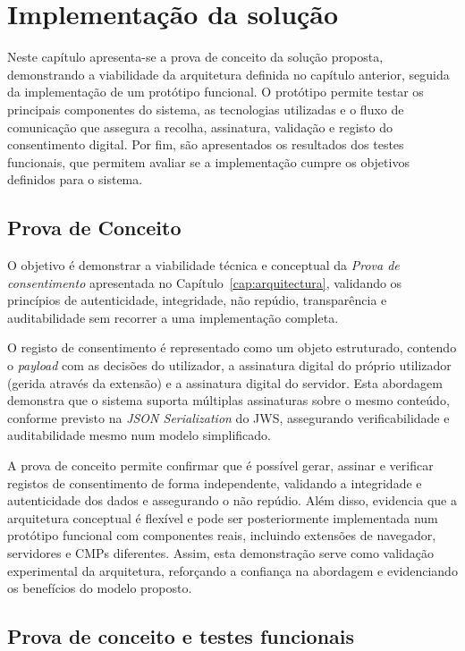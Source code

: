 \chapter{Implementação da solução}
\label{cap:implementacao}

Neste capítulo apresenta-se a prova de conceito da solução proposta, demonstrando a viabilidade da arquitetura definida no capítulo anterior, seguida da implementação de um protótipo funcional. O protótipo permite testar os principais componentes do sistema, as tecnologias utilizadas e o fluxo de comunicação que assegura a recolha, assinatura, validação e registo do consentimento digital. Por fim, são apresentados os resultados dos testes funcionais, que permitem avaliar se a implementação cumpre os objetivos definidos para o sistema.

\section{Prova de Conceito}

O objetivo é demonstrar a viabilidade técnica e conceptual da \textit{Prova de consentimento} apresentada no Capítulo~\ref{cap:arquitectura}, validando os princípios de autenticidade, integridade, não repúdio, transparência e auditabilidade sem recorrer a uma implementação completa.

O registo de consentimento é representado como um objeto estruturado, contendo o \textit{payload} com as decisões do utilizador, a assinatura digital do próprio utilizador (gerida através da extensão) e a assinatura digital do servidor. Esta abordagem demonstra que o sistema suporta múltiplas assinaturas sobre o mesmo conteúdo, conforme previsto na \textit{JSON Serialization} do JWS, assegurando verificabilidade e auditabilidade mesmo num modelo simplificado.

A prova de conceito permite confirmar que é possível gerar, assinar e verificar registos de consentimento de forma independente, validando a integridade e autenticidade dos dados e assegurando o não repúdio. Além disso, evidencia que a arquitetura conceptual é flexível e pode ser posteriormente implementada num protótipo funcional com componentes reais, incluindo extensões de navegador, servidores e CMPs diferentes. Assim, esta demonstração serve como validação experimental da arquitetura, reforçando a confiança na abordagem e evidenciando os benefícios do modelo proposto.

\section{Prova de conceito e testes funcionais}

